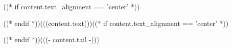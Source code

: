 \noindent\par ((* if content.text_alignment == 'center' *)){\setlength\topsep{0pt}\setlength\parskip{0pt}\begin{center}((* endif *))(((content.text)))((* if content.text_alignment == 'center' *))\end{center}}((* endif *))\noindent (((- content.tail -)))